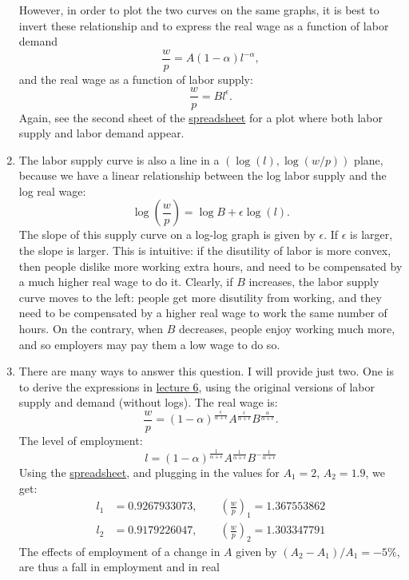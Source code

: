 \documentclass[]{book}
\theoremstyle{definition}
\theoremstyle{definition}
\theoremstyle{definition}
\theoremstyle{remark}
\begin{document}
\begin{enumerate}
  However, in order to plot the two curves on the same graphs, it is
  best to invert these relationship and to express the real wage as a
  function of labor demand \[\frac{w}{p}=A (1-\alpha)l^{-\alpha},\] and
  the real wage as a function of labor supply:
  \[\frac{w}{p}=B l^{\epsilon}.\] Again, see the second sheet of the
  \href{https://docs.google.com/spreadsheets/d/1h9JJD8K2_IE166gdj78waf0zu4YDY9Rp3r5oiJR_06s/edit?usp=sharing}{spreadsheet}
  for a plot where both labor supply and labor demand appear.
\item
  The labor supply curve is also a line in a \((\log(l), \log(w/p))\)
  plane, because we have a linear relationship between the log labor
  supply and the log real wage:
  \[\boxed{\log\left(\frac{w}{p}\right)=\log B + \epsilon \log(l)}.\]
  The slope of this supply curve on a log-log graph is given by
  \(\epsilon\). If \(\epsilon\) is larger, the slope is larger. This is
  intuitive: if the disutility of labor is more convex, then people
  dislike more working extra hours, and need to be compensated by a much
  higher real wage to do it. Clearly, if \(B\) increases, the labor
  supply curve moves to the left: people get more disutility from
  working, and they need to be compensated by a higher real wage to work
  the same number of hours. On the contrary, when \(B\) decreases,
  people enjoy working much more, and so employers may pay them a low
  wage to do so.
\item
  There are many ways to answer this question. I will provide just two.
  One is to derive the expressions in
  \protect\hyperlink{labor-market}{lecture 6}, using the original
  versions of labor supply and demand (without logs). The real wage is:
  \[\frac{w}{p} = (1-\alpha)^{\frac{\epsilon}{\alpha+\epsilon}}A^{\frac{\epsilon}{\alpha+\epsilon}} B^{\frac{\alpha}{\alpha+\epsilon}}.\]
  The level of employment:
  \[l= (1-\alpha)^{\frac{1}{\alpha+\epsilon}}A^{\frac{1}{\alpha+\epsilon}} B^{-\frac{1}{\alpha+\epsilon}}\]
  Using the
  \href{https://docs.google.com/spreadsheets/d/1h9JJD8K2_IE166gdj78waf0zu4YDY9Rp3r5oiJR_06s/edit?usp=sharing}{spreadsheet},
  and plugging in the values for \(A_1 = 2\), \(A_2 = 1.9\), we get: \[
  \begin{aligned}
  l_1 &=0.9267933073, \qquad \left(\frac{w}{p}\right)_1=1.367553862\\
  l_2 &=0.9179226047, \qquad \left(\frac{w}{p}\right)_2=1.303347791
  \end{aligned}
  \] The effects of employment of a change in \(A\) given by
  \((A_2-A_1)/A_1=-5\%\), are thus a fall in employment and in real

\end{enumerate}
\end{document}
